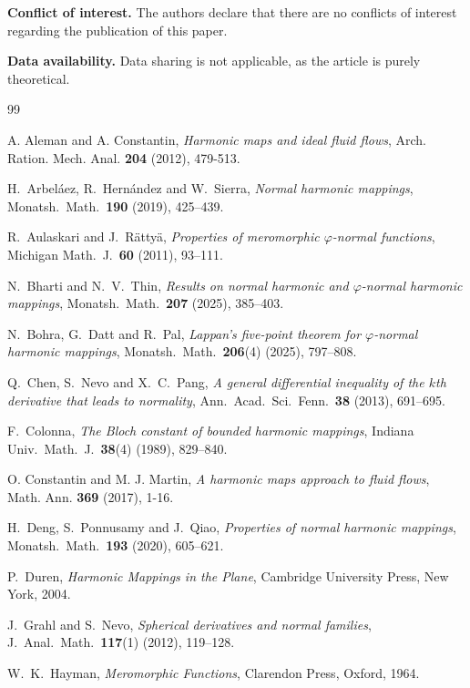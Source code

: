 \documentclass[11pt,reqno]{amsart}
\theoremstyle{definition}
\begin{document}
\medskip
\noindent\textbf{Conflict of interest.} The authors declare that there are no conflicts of
interest regarding the publication of this paper.

\medskip
\noindent\textbf{Data availability.} Data sharing is not applicable, as the article is
purely theoretical.

\begin{thebibliography}{99}

 A. Aleman and A. Constantin, \emph{Harmonic maps and ideal fluid flows}, Arch. Ration. Mech. Anal. \textbf{204} (2012), 479-513.

 H.~Arbel\'aez, R.~Hern\'andez and W.~Sierra,
\emph{Normal harmonic mappings}, Monatsh.\ Math.\ \textbf{190} (2019), 425--439.

 R.~Aulaskari and J.~R\"atty\"a,
\emph{Properties of meromorphic $\varphi$-normal functions}, Michigan Math.\ J.\
\textbf{60} (2011), 93--111.

 N.~Bharti and N.~V.~Thin,
\emph{Results on normal harmonic and $\varphi$-normal harmonic mappings}, Monatsh.\ Math.\
\textbf{207} (2025), 385--403.

 N.~Bohra, G.~Datt and R.~Pal,
\emph{Lappan's five-point theorem for $\varphi$-normal harmonic mappings}, Monatsh.\ Math.\
\textbf{206}(4) (2025), 797--808.

\bibitem{CNP} Q.~Chen, S.~Nevo and X.~C.~Pang,
\emph{A general differential inequality of the $k$th derivative that leads to normality},
Ann.\ Acad.\ Sci.\ Fenn.\ \textbf{38} (2013), 691--695.

\bibitem{Colonna} F.~Colonna,
\emph{The Bloch constant of bounded harmonic mappings}, Indiana Univ.\ Math.\ J.\
\textbf{38}(4) (1989), 829--840.

\bibitem{OCM} O. Constantin and M. J. Martin, \emph{A harmonic maps approach to fluid flows}, Math. Ann. \textbf{369} (2017), 1-16.

\bibitem{DPQ} H.~Deng, S.~Ponnusamy and J.~Qiao,
\emph{Properties of normal harmonic mappings}, Monatsh.\ Math.\ \textbf{193} (2020),
605--621.

\bibitem{Duren} P.~Duren,
\emph{Harmonic Mappings in the Plane}, Cambridge University Press, New York, 2004.

 J.~Grahl and S.~Nevo,
\emph{Spherical derivatives and normal families}, J.\ Anal.\ Math.\ \textbf{117}(1) (2012),
119--128.

\bibitem{Hayman} W.~K.~Hayman,
\emph{Meromorphic Functions}, Clarendon Press, Oxford, 1964.


\end{thebibliography}
\end{document}
